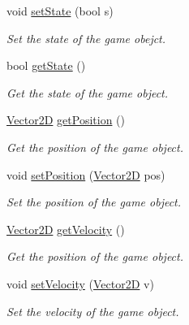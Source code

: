 \begin{DoxyCompactItemize}
void \mbox{\hyperlink{class_game_object_a32361eefe52e77fd0ac60502dab7aa86}{set\+State}} (bool s)
\begin{DoxyCompactList}\small\item\em Set the state of the game obejct. \end{DoxyCompactList}\item 
\mbox{\label{class_game_object_ae02b0c8136b289fc3ef27f2bc9cd7598}} 
bool \mbox{\hyperlink{class_game_object_ae02b0c8136b289fc3ef27f2bc9cd7598}{get\+State}} ()
\begin{DoxyCompactList}\small\item\em Get the state of the game object. \end{DoxyCompactList}\item 
\mbox{\label{class_game_object_a04b48a69000e73373351c1da11972ea2}} 
\mbox{\hyperlink{struct_vector2_d}{Vector2D}} \mbox{\hyperlink{class_game_object_a04b48a69000e73373351c1da11972ea2}{get\+Position}} ()
\begin{DoxyCompactList}\small\item\em Get the position of the game object. \end{DoxyCompactList}\item 
void \mbox{\hyperlink{class_game_object_af96bc25a3677e398982e55ed8032aa19}{set\+Position}} (\mbox{\hyperlink{struct_vector2_d}{Vector2D}} pos)
\begin{DoxyCompactList}\small\item\em Set the position of the game object. \end{DoxyCompactList}\item 
\mbox{\label{class_game_object_ab3b1152ff19dbd6098491ca6d6c13558}} 
\mbox{\hyperlink{struct_vector2_d}{Vector2D}} \mbox{\hyperlink{class_game_object_ab3b1152ff19dbd6098491ca6d6c13558}{get\+Velocity}} ()
\begin{DoxyCompactList}\small\item\em Get the position of the game object. \end{DoxyCompactList}\item 
void \mbox{\hyperlink{class_game_object_a0abf4d585166c4f33c048489f61592c0}{set\+Velocity}} (\mbox{\hyperlink{struct_vector2_d}{Vector2D}} v)
\begin{DoxyCompactList}\small\item\em Set the velocity of the game object. \end{DoxyCompactList}\item 

\end{DoxyCompactItemize}
